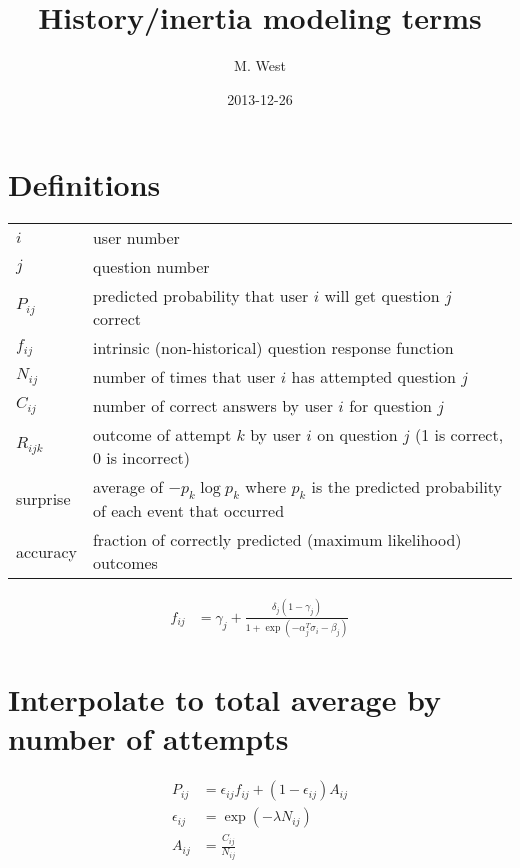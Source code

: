 \documentclass{article}
\begin{document}
\title{History/inertia modeling terms}
\author{M. West}
\date{2013-12-26}
\maketitle

\section{Definitions}

\begin{center}
  \begin{tabular}{ll}
    $i$ & user number \\
    $j$ & question number \\
    $P_{ij}$ & predicted probability that user $i$ will get question $j$ correct \\
    $f_{ij}$ & intrinsic (non-historical) question response function \\
    $N_{ij}$ & number of times that user $i$ has attempted question $j$ \\
    $C_{ij}$ & number of correct answers by user $i$ for question $j$ \\
    $R_{ijk}$ & outcome of attempt $k$ by user $i$ on question $j$ (1 is correct, 0 is incorrect) \\
    surprise & average of $-p_k \log p_k$ where $p_k$ is the predicted probability of each event that occurred \\
    accuracy & fraction of correctly predicted (maximum likelihood) outcomes
  \end{tabular}
\end{center}

\begin{align*}
  f_{ij} &= \gamma_j + \frac{\delta_j (1 - \gamma_j)}{1 + \exp(-\alpha_j^T \sigma_i - \beta_j)}
\end{align*}

\section{Interpolate to total average by number of attempts}

\begin{align*}
  P_{ij} &= \epsilon_{ij} f_{ij} + (1 - \epsilon_{ij}) A_{ij} \\
  \epsilon_{ij} &= \exp(-\lambda N_{ij}) \\
  A_{ij} &= \frac{C_{ij}}{N_{ij}}
\end{align*}
\end{document}
